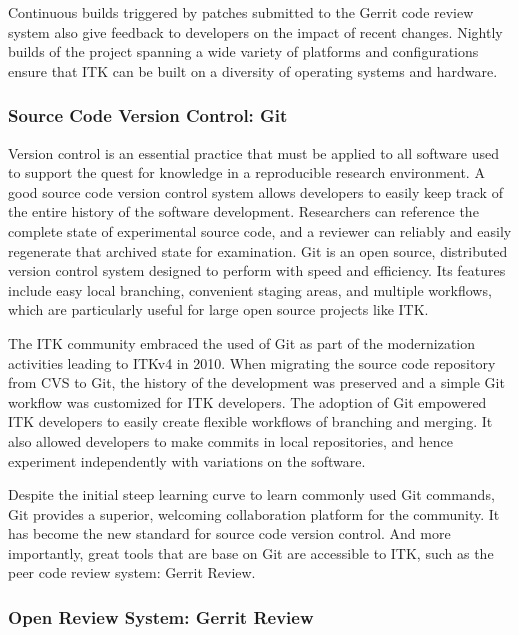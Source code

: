 \documentclass{frontiersENG} %
\begin{document}
Continuous builds triggered by patches submitted to the Gerrit code review
system also give feedback to developers on the impact of recent changes.
Nightly builds of the project spanning a wide variety of platforms and
configurations ensure that ITK can be built on a diversity of operating systems
and hardware.


\subsubsection{Source Code Version Control: Git}

Version control is an essential practice that must be applied to all software
used to support the quest for knowledge in a reproducible research environment.
A good source code version control system allows developers to easily keep
track of the entire history of the software development. Researchers can
reference the complete state of experimental source code, and a reviewer can
reliably and easily regenerate that archived state for examination.  Git is an
open source, distributed version control system designed to perform with speed
and efficiency. Its features include easy local branching, convenient staging
areas, and multiple workflows, which are particularly useful for large open
source projects like ITK.

The ITK community embraced the used of Git as part of the modernization
activities leading to ITKv4 in 2010.  When migrating the source code repository
from CVS to Git, the history of the development was preserved and a simple Git
workflow was customized for ITK developers.  The adoption of Git empowered ITK
developers to easily create flexible workflows of branching and merging. It
also allowed developers to make commits in local repositories, and hence
experiment independently with variations on the software.

Despite the initial steep learning curve to learn commonly used Git commands,
Git provides a superior, welcoming collaboration platform for the community. It
has become the new standard for source code version control.  And more
importantly, great tools that are base on Git are accessible to ITK, such as
the peer code review system: Gerrit Review.


\subsubsection{Open Review System: Gerrit Review}
\end{document}
